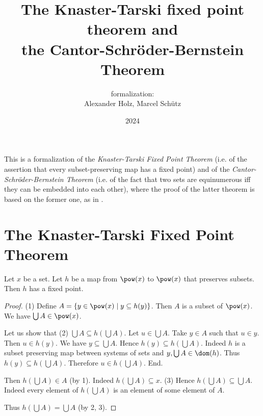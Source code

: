 \documentclass{article}
\title{The Knaster-Tarski fixed point theorem and \\
the Cantor-Schröder-Bernstein Theorem}
\author{\Naproche formalization:\\[0.5em]Alexander Holz, Marcel Schütz}
\date{2024}
\begin{document}
  \maketitle


  \noindent This is a formalization of the \textit{Knaster-Tarski Fixed Point
  Theorem} (i.e. of the assertion that every subset-preserving map has a fixed
  point) and of the \textit{Cantor-Schröder-Bernstein Theorem} (i.e. of the
  fact that two sets are equinumerous iff they can be embedded into each other),
  where the proof of the latter theorem is based on the former one, as in
  \cite{Schroeder2012}.


  \section*{The Knaster-Tarski Fixed Point Theorem}

  \begin{forthel}
    \begin{theorem*}[title=Knaster-Tarski,id=knaster_tarski]
      Let $x$ be a set.
      Let $h$ be a map from $\pow(x)$ to $\pow(x)$ that preserves subsets.
      Then $h$ has a fixed point.
    \end{theorem*}
    \begin{proof}
      (1) Define $A = \{y \in \pow(x) \mid y \subseteq h(y)\}$.
      Then $A$ is a subset of $\pow(x)$.
      We have $\bigcup A \in \pow(x)$.

      Let us show that (2) $\bigcup A \subseteq h(\bigcup A)$.
        Let $u \in \bigcup A$.
        Take $y \in A$ such that $u \in y$.
        Then $u \in h(y)$.
        We have $y \subseteq \bigcup A$.
        Hence $h(y) \subseteq h(\bigcup A)$.
        Indeed $h$ is a subset preserving map between systems of sets and $y, \bigcup A \in \dom(h)$.
        Thus $h(y) \subseteq h(\bigcup A)$.
        Therefore $u \in h(\bigcup A)$.
      End.

      Then $h(\bigcup A) \in A$ (by 1).
      Indeed $h(\bigcup A) \subseteq x$.
      (3) Hence $h(\bigcup A) \subseteq \bigcup A$.
      Indeed every element of $h(\bigcup A)$ is an element of some element of
      $A$.

      Thus $h(\bigcup A) = \bigcup A$ (by 2, 3).
    \end{proof}
  \end{forthel}
\end{document}
